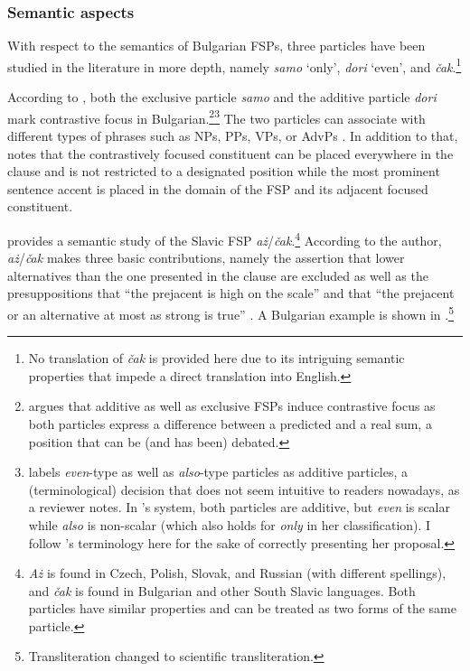 \documentclass[output=paper,colorlinks,citecolor=brown]{langscibook}
\begin{document}
\subsubsection{Semantic aspects}\label{sec:2.1.2}
With respect to the semantics of Bulgarian FSPs, three particles have been studied in the literature in more depth, namely \textit{samo} `only', \textit{dori} `even', and \textit{\v cak}.\footnote{No translation of \textit{\v cak} is provided here due to its intriguing semantic properties that impede a direct translation into English.} \par 
According to \citet{Nicolova2000}, both the exclusive particle \textit{samo} and the additive particle \textit{dori} mark contrastive focus in Bulgarian.\footnote{\citet[108]{Nicolova2000} argues that additive as well as exclusive FSPs induce contrastive focus as both particles express a difference between a predicted and a real sum, a position that can be (and has been) debated.}\footnote{\citet{Nicolova2000} labels \textit{even}-type as well as \textit{also}-type particles as additive particles, a (terminological) decision that does not seem intuitive to readers nowadays, as a reviewer notes. In \citeauthor{Nicolova2000}'s system, both particles are additive, but \textit{even} is scalar while \textit{also} is non-scalar (which also holds for \textit{only} in her classification). I follow \citeauthor{Nicolova2000}'s terminology here for the sake of correctly presenting her proposal.} The two particles can associate with different types of phrases such as NPs, PPs, VPs, or AdvPs \citep[109]{Nicolova2000}. In addition to that, \citet{Nicolova2000} notes that the contrastively focused constituent can be placed everywhere in the clause and is not restricted to a designated position while the most prominent sentence accent is placed in the domain of the FSP and its adjacent focused constituent. \par 
\citet{Tomaszewicz2013} provides a semantic study of the Slavic FSP \textit{a\.z}/\textit{\v cak}.\footnote{\textit{A\.z} is found in Czech, Polish, Slovak, and Russian (with different spellings), and \textit{\v cak} is found in Bulgarian and other South Slavic languages. Both particles have similar properties and can be treated as two forms of the same particle.} According to the author, \textit{a\.z}/\textit{\v cak} makes three basic contributions, namely the assertion that lower alternatives than the one presented in the clause are excluded as well as the presuppositions that ``the prejacent is high on the scale'' and that ``the prejacent or an alternative at most as strong is true'' \citep[321]{Tomaszewicz2013}. A Bulgarian example is shown in  \citep[from][302]{Tomaszewicz2013}.\footnote{Transliteration changed to scientific transliteration.}
\end{document}
